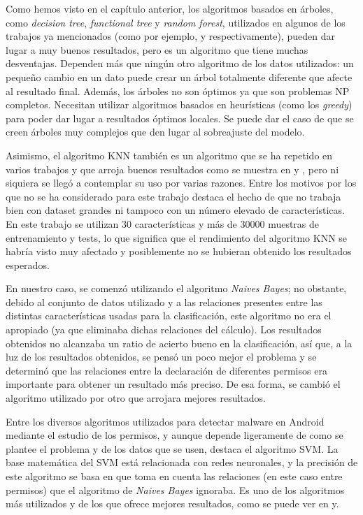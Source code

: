 Como hemos visto en el capítulo anterior, los algoritmos basados en árboles, como \textit{decision tree}, \textit{functional tree} y \textit{random forest}, utilizados en algunos de los trabajos ya mencionados (como por ejemplo\hypersetup{citecolor=red}\cite{giang},\hypersetup{citecolor=red}\cite{sigpid} y\hypersetup{citecolor=red}\cite{kumar} respectivamente), pueden dar lugar a muy buenos resultados, pero es un algoritmo que tiene muchas desventajas. Dependen más que ningún otro algoritmo de los datos utilizados: un pequeño cambio en un dato puede crear un árbol totalmente diferente que afecte al resultado final. Además, los árboles no son óptimos ya que son problemas NP completos. Necesitan utilizar algoritmos basados en heurísticas (como los \textit{greedy}) para poder dar lugar a resultados óptimos locales. Se puede dar el caso de que se creen árboles muy complejos que den lugar al sobreajuste del modelo\hypersetup{citecolor=red}\cite{tree}.

Asimismo, el algoritmo KNN también es un algoritmo que se ha repetido en varios trabajos y que arroja buenos resultados como se muestra en\hypersetup{citecolor=red}\cite{jiang} y \hypersetup{citecolor=red}\cite{kumar}, pero ni siquiera se llegó a contemplar su uso por varias razones. Entre los motivos por los que no se ha considerado para este trabajo destaca el hecho de que no trabaja bien con dataset grandes ni tampoco con un número elevado de características\hypersetup{citecolor=red}\cite{nadar}. En este trabajo se utilizan 30 características y más de 30000 muestras de entrenamiento y tests, lo que significa que el rendimiento del algoritmo KNN se habría visto muy afectado y posiblemente no se hubieran obtenido los resultados esperados.

En nuestro caso, se comenzó utilizando el algoritmo \textit{Naives Bayes}; no obstante, debido al conjunto de datos utilizado y a las relaciones presentes entre las distintas características usadas para la clasificación, este algoritmo no era el apropiado (ya que eliminaba dichas relaciones del cálculo). Los resultados obtenidos no alcanzaba un ratio de acierto bueno en la clasificación, así que, a la luz de los resultados obtenidos, se pensó un poco mejor el problema y se determinó que las relaciones entre la declaración de diferentes permisos era importante para obtener un resultado más preciso. De esa forma, se cambió el algoritmo utilizado por otro que arrojara mejores resultados.

Entre los diversos algoritmos utilizados para detectar malware en Android mediante el estudio de los permisos, y aunque depende ligeramente de como se plantee el problema y de los datos que se usen, destaca el algoritmo SVM. La base matemática del SVM está relacionada con redes neuronales\hypersetup{citecolor=red}\cite{svmwiki}, y la precisión de este algoritmo se basa en que toma en cuenta las relaciones (en este caso entre permisos) que el algoritmo de \textit{Naives Bayes} ignoraba. Es uno de los algoritmos más utilizados y de los que ofrece mejores resultados, como se puede ver en\hypersetup{citecolor=red}\cite{jiang} y\hypersetup{citecolor=red}\cite{sigpid}.

